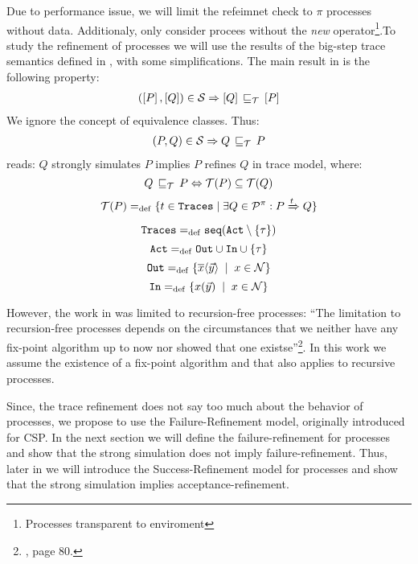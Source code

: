 Due to performance issue, we will limit the refeimnet check to $\pi$ processes without data. Additionaly, only consider procees without the \textit{new} operator\footnote{Processes transparent to enviroment}.To study the refinement of \picalc{} processes we will use the results of the big-step trace semantics defined in \cite{gieseking}, with some simplifications. 
The main result in \cite{gieseking} is the following property:
\begin{align}
    (\ec{P},\ec{Q})\in{}\simu \Rightarrow \ec{Q} \refi \ec{P} \label{property1}
\end{align}
We ignore the concept of equivalence classes. Thus:
\begin{align}
    (P,Q)\in{}\simu \Rightarrow Q \refi P
\label{property2}
\end{align}
 reads: $Q$ strongly simulates $P$ implies $P$ refines $Q$ in trace model, where:
\[Q\refi P \Leftrightarrow \Traces[P]\subseteq\Traces[Q]\]
\[\Traces[P] \define \{t\in \tr \mid \exists Q\in\procs: P \bigstep{t} Q\}\]
\[\tr \define \seqset{\actions\setminus\set{\tau}}\]
\[\actions\define\outA\cup\inA\cup\set{\tau}\]
\[\outA\define\set[x\in\names]{\out{x}{\vec{y}}}\]
\[\inA\define\set[x\in\names]{\inp{x}{\vec{y}}}\]

However, the work in \cite{gieseking} was limited to recursion-free processes: ``The limitation to recursion-free processes depends on the circumstances that we neither have any fix-point algorithm up to now nor showed that one existse''\footnote{\cite{gieseking}, page $80$.}. In this work we assume the existence of a fix-point algorithm and that  also applies to recursive processes.


Since, the trace refinement does not say too much about the behavior of processes, we propose to use the Failure-Refinement model, originally introduced for CSP. In the next section we will define the failure-refinement for \picalc{} processes and show that the strong simulation does not imply failure-refinement. Thus, later in  we will introduce the Success-Refinement model for \picalc{} processes and show that the strong simulation implies acceptance-refinement.
